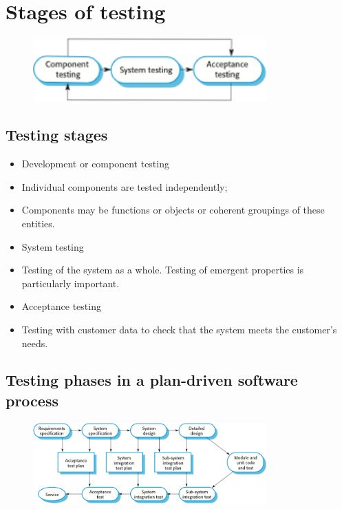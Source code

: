 \section{Stages of testing}
\begin{figure}[h!]
    \centering
    \includegraphics[width = 0.8\textwidth]{./figures/stagesoftesting_L1_6.png}
    \caption{}
    \label{fig:L1_6}
\end{figure}


\subsection{Testing stages}
\begin{itemize}
\item Development or component testing \item Individual components are tested independently;
\item Components may be functions or objects or coherent groupings of these entities.

\item System testing

\item Testing of the system as a whole. Testing of emergent properties is particularly important.

\item Acceptance testing

\item Testing with customer data to check that the system meets the customer’s needs.
\end{itemize}

\newpage
\subsection{Testing phases in a plan-driven software process}
\begin{figure}[h!]
    \centering
    \includegraphics[width = 0.8\textwidth]{./figures/testing_phases_L1_7.png}
    \caption{}
    \label{fig:L1_7}
\end{figure}




